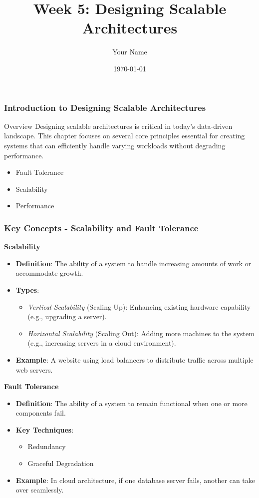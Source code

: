 \documentclass{beamer}
\title{Week 5: Designing Scalable Architectures}
\author{Your Name}
\institute{Your Institution}
\date{\today}
\begin{document}
\frame{\titlepage}

\begin{frame}[fragile]
    \frametitle{Introduction to Designing Scalable Architectures}
    \begin{block}{Overview}
        Designing scalable architectures is critical in today's data-driven landscape. This chapter focuses on several core principles essential for creating systems that can efficiently handle varying workloads without degrading performance.
    \end{block}
    \begin{itemize}
        \item Fault Tolerance
        \item Scalability
        \item Performance
    \end{itemize}
\end{frame}

\begin{frame}[fragile]
    \frametitle{Key Concepts - Scalability and Fault Tolerance}
    
    \textbf{Scalability}
    \begin{itemize}
        \item \textbf{Definition}: The ability of a system to handle increasing amounts of work or accommodate growth.
        \item \textbf{Types}:
            \begin{itemize}
                \item \textit{Vertical Scalability} (Scaling Up): Enhancing existing hardware capability (e.g., upgrading a server).
                \item \textit{Horizontal Scalability} (Scaling Out): Adding more machines to the system (e.g., increasing servers in a cloud environment).
            \end{itemize}
        \item \textbf{Example}: A website using load balancers to distribute traffic across multiple web servers.
    \end{itemize}
    
    \textbf{Fault Tolerance}
    \begin{itemize}
        \item \textbf{Definition}: The ability of a system to remain functional when one or more components fail.
        \item \textbf{Key Techniques}:
            \begin{itemize}
                \item Redundancy
                \item Graceful Degradation
            \end{itemize}
        \item \textbf{Example}: In cloud architecture, if one database server fails, another can take over seamlessly.
    \end{itemize}
\end{frame}
\end{document}
